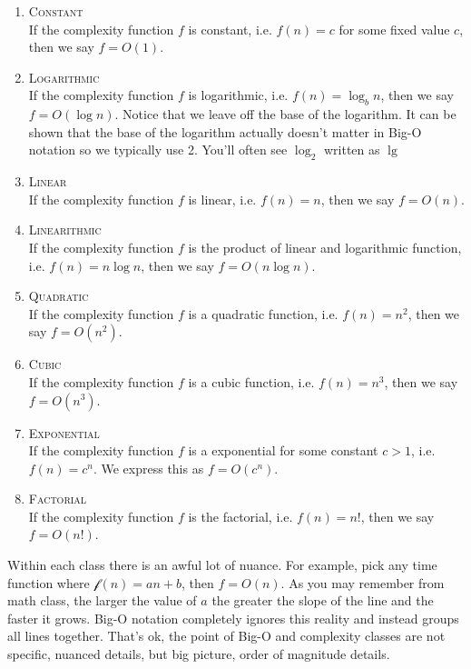 \documentclass[]{tufte-handout}
\begin{document}
\begin{enumerate}
\item \textsc{Constant} \\
 If the complexity function $f$ is constant, i.e. $f(n) = c$ for some fixed value $c$,  then we say $f = O(1)$.

\item \textsc{Logarithmic} \\
 If the complexity function $f$ is  logarithmic, i.e. $f(n) = \log_b n$, then we say $f = O(\log n)$. Notice that we leave off the base of the logarithm. It can be shown that the base of the logarithm actually doesn't matter in Big-O notation so we typically use 2. You'll often see $\log_2$ written as $\lg$

\item \textsc{Linear} \\
 If the complexity function $f$ is linear, i.e. $f(n) = n$, then we say $f = O(n)$.

\item \textsc{Linearithmic} \\
 If the complexity function $f$ is the product of linear and logarithmic function, i.e. $f(n) = n\log n$, then we say $f = O(n\log n)$.

\item \textsc{Quadratic} \\
 If the complexity function $f$ is a quadratic function, i.e. $f(n) = n^2$, then we say $f = O(n^2)$.

\item \textsc{Cubic} \\
If the complexity function $f$ is a cubic function, i.e. $f(n) = n^3$, then we say $f = O(n^3)$.

\item \textsc{Exponential} \\
If the complexity function $f$ is a exponential for some constant $c>1$, i.e. $f(n) = c^n$. We express this as  $f = O(c^n)$.

\item \textsc{Factorial} \\
If the complexity function $f$ is the factorial, i.e. $f(n) = n!$, then we say $f = O(n!)$.
\end{enumerate}

Within each class there is an awful lot of nuance. For example, pick any time function where $\mathcal{f}(n)= an + b$, then $f = O(n)$. As you may remember from math class, the larger the value of $a$ the greater the slope of the line and the faster it grows. Big-O notation completely ignores this reality and instead groups all lines together. That's ok, the point of Big-O and complexity classes are not specific, nuanced details, but big picture, order of magnitude details.
\end{document}
